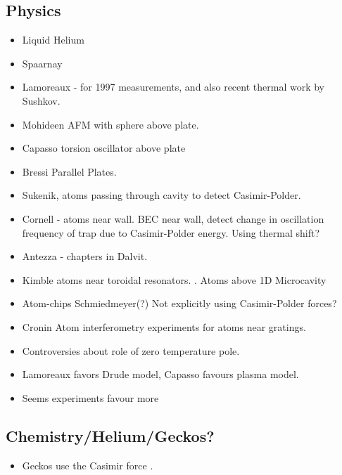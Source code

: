 \subsection{Physics}
\begin{itemize}
\item Liquid Helium
\item Spaarnay

\item Lamoreaux - for 1997 measurements\cite{Lamoreaux1997}, and also recent thermal work by Sushkov\cite{Sushkov2011}.

\item Mohideen \cite{Mohideen1998} AFM with sphere above plate.

\item Capasso \cite{Chan2001}  torsion oscillator above plate
\item Bressi \cite{Bressi2002} Parallel Plates.
\item Sukenik\cite{Sukenik1993}, atoms passing through cavity to detect Casimir-Polder.  
\item Cornell - atoms near wall\cite{Harber2005, Obrecht2007}.
  BEC near wall, detect change in oscillation frequency of trap due to Casimir-Polder energy.
  Using thermal shift?
\item Antezza - chapters in Dalvit.  
\item Kimble atoms near toroidal resonators.
  \cite{Alton2011}.
  Atoms above 1D Microcavity \cite{Hung2013}
\item Atom-chips  Schmiedmeyer\cite{Folman2000,Schneider2003}(?)  Not explicitly using Casimir-Polder forces?  
\item Cronin \cite{Perreault2005,Lonij2009}  Atom interferometry experiments for atoms near gratings.
\end{itemize}

\begin{itemize}
\item Controversies about role of zero temperature pole.  
\item Lamoreaux favors Drude model, Capasso favours plasma model.
\item Seems experiments favour more 
\end{itemize}

\subsection{Chemistry/Helium/Geckos?}

\begin{itemize}
\item Geckos use the Casimir force \cite{Autumn2002}.
\end{itemize}

